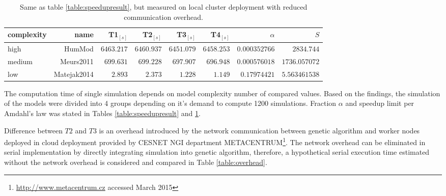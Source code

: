 \begin{table}[htb]
\footnotesize
\begin{tabular}{|l|r|r|r|r|r|r|r|}
\hline
complexity & name & T1$_{[s]}$ & T2$_{[s]}$ & T3$_{[s]}$ & T4$_{[s]}$ & $\alpha$ & $S$ \\
\hline
high & HumMod \cite{Kofranek2011hummod} & $\num{6463.217}$ & $\num{6460.937}$ & $\num{6451.079}$ & $\num{6458.253}$ & $\num{0.000352766}$ & $\num{2834.744}$ \\
medium & Meurs2011\cite{Meurs2011} & $\num{699.631}$ & $\num{699.228}$ & $\num{697.907}$ & $\num{696.948}$ & $\num{0.000576018}$ & $\num{1736.057072}$ \\
low & Matejak2014\cite{Matejak2014sj} & $\num{2.893}$ & $\num{2.373}$ & $\num{1.228}$ & $\num{1.149}$ & $\num{0.17974421}$ & $\num{5.563461538}$\\ \hline
\end{tabular}
\caption{Same as table \ref{table:speedupresult}, but measured on local cluster deployment with reduced communication overhead.}
\label{table:speedupresult2}
\end{table}

The computation time of single simulation depends on model complexity number of compared values. Based on the findings, the simulation of the models were divided into 4 groups depending on it's demand to compute 1200 simulations. Fraction $\alpha$ and speedup limit per Amdahl's law was stated in Tables \ref{table:speedupresult} and \ref{table:speedupresult2}. 

Difference between $T2$ and $T3$ is an overhead introduced by the network communication between genetic algorithm and worker nodes deployed in cloud deployment provided by CESNET NGI department METACENTRUM\footnote{\url{http://www.metacentrum.cz} accessed March 2015}. The network overhead can be eliminated in serial implementation by directly integrating simulation into genetic algorithm, therefore, a hypothetical serial execution time estimated without the network overhead is considered and compared in Table \ref{table:overhead}.

